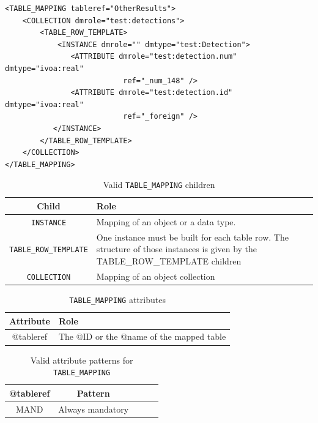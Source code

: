 \documentclass[11pt,a4paper]{ivoa}
\begin{document}
\begin{lstlisting}[caption={TABLE\_MAPPING block example},style=XML]
<TABLE_MAPPING tableref="OtherResults">
    <COLLECTION dmrole="test:detections">
        <TABLE_ROW_TEMPLATE>
            <INSTANCE dmrole="" dmtype="test:Detection">
               <ATTRIBUTE dmrole="test:detection.num" dmtype="ivoa:real"
                           ref="_num_148" />
               <ATTRIBUTE dmrole="test:detection.id" dmtype="ivoa:real"
                           ref="_foreign" />
           </INSTANCE>
        </TABLE_ROW_TEMPLATE>
    </COLLECTION>
</TABLE_MAPPING>
\end{lstlisting}


\begin{table}[!htbp]
\small
\centering
\begin{tabulary}{\linewidth}{|c|J|}       
       \hline 
           \textbf{Child} &  
           \textbf{Role}\\
       \hline         \hline  
           \texttt{INSTANCE}    & 
           Mapping of an object or a data type.  \\              
       \hline  
            \texttt{TABLE\_ROW\_TEMPLATE}    &  
            One instance must be built for each table row. 
             \newline The structure of those instances is given by the TABLE\_ROW\_TEMPLATE children \\              
       \hline  
             \texttt{COLLECTION}    &  
             Mapping of an object collection \\       
       \hline 
     \end{tabulary}
     \caption{Valid \texttt{TABLE\_MAPPING} children} 
     \label{tbl:templ-children}
 \end{table}


\begin{table}[!htbp]
\small
\centering
\begin{tabulary}{\linewidth}{|c|J|}       
       \hline 
            \textbf{Attribute} & 
            \textbf {Role}\\
       \hline         \hline  
            @tableref  & 
            The @ID or the @name of the mapped table  \\
       \hline 
     \end{tabulary}
     \caption{\texttt{TABLE\_MAPPING} attributes} 
     \label{tbl:templ-att}
 \end{table}

\begin{table}[!htbp]
\small
\centering
\begin{tabulary}{\linewidth}{|c|c|c|c|J|}
    \hline 
        \textbf{@tableref} &
        \textbf{Pattern}\\
    \hline      \hline  
        MAND &   
        Always mandatory\\
   \hline 
\end{tabulary}
     \caption{Valid attribute patterns for  \texttt{TABLE\_MAPPING}} 
     \label{tbl:templ-pattern}
 \end{table}
\FloatBarrier
\end{document}
